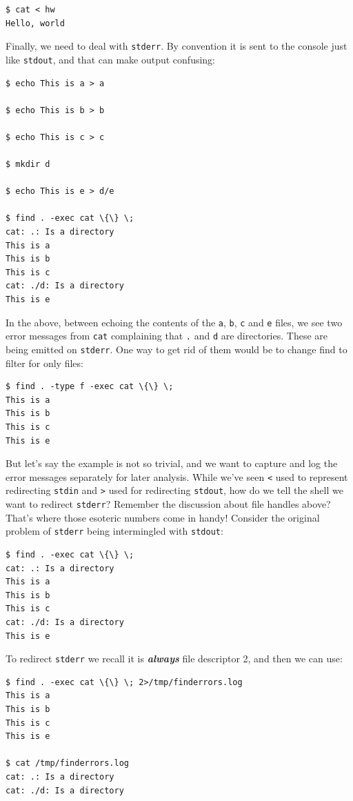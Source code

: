 \documentclass[10pt,]{book}
\numberwithin{figure}{chapter}
\begin{document}
\begin{verbatim}
$ cat < hw
Hello, world
\end{verbatim}

Finally, we need to deal with \texttt{stderr}. By convention it is sent
to the console just like \texttt{stdout}, and that can make output
confusing:

\begin{verbatim}
$ echo This is a > a

$ echo This is b > b

$ echo This is c > c

$ mkdir d

$ echo This is e > d/e

$ find . -exec cat \{\} \;
cat: .: Is a directory
This is a
This is b
This is c
cat: ./d: Is a directory
This is e
\end{verbatim}

In the above, between echoing the contents of the \texttt{a},
\texttt{b}, \texttt{c} and \texttt{e} files, we see two error messages
from \texttt{cat} complaining that \texttt{.} and \texttt{d} are
directories. These are being emitted on \texttt{stderr}. One way to get
rid of them would be to change find to filter for only files:

\begin{verbatim}
$ find . -type f -exec cat \{\} \;
This is a
This is b
This is c
This is e
\end{verbatim}

But let's say the example is not so trivial, and we want to capture and
log the error messages separately for later analysis. While we've seen
\texttt{\textless{}} used to represent redirecting \texttt{stdin} and
\texttt{\textgreater{}} used for redirecting \texttt{stdout}, how do we
tell the shell we want to redirect \texttt{stderr}? Remember the
discussion about file handles above? That's where those esoteric numbers
come in handy! Consider the original problem of \texttt{stderr} being
intermingled with \texttt{stdout}:

\begin{verbatim}
$ find . -exec cat \{\} \;
cat: .: Is a directory
This is a
This is b
This is c
cat: ./d: Is a directory
This is e
\end{verbatim}

To redirect \texttt{stderr} we recall it is \textbf{\emph{always}} file
descriptor 2, and then we can use:

\begin{verbatim}
$ find . -exec cat \{\} \; 2>/tmp/finderrors.log
This is a
This is b
This is c
This is e

$ cat /tmp/finderrors.log
cat: .: Is a directory
cat: ./d: Is a directory
\end{verbatim}
\end{document}
